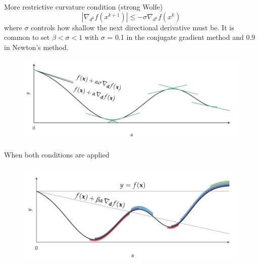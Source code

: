 \documentclass{beamer}
\begin{document}
\begin{frame}{More restrictive curvature condition (strong Wolfe)}
    \begin{equation*}
        |\nabla _{d^k} f(x^{k+1})| \leq -\sigma \nabla _{d^k} f(x^k)
    \end{equation*}
where $\sigma$ controls how shallow the next directional derivative must be.
It is common to set $\beta < \sigma < 1$ with $\sigma$ = 0.1 in the conjugate gradient method and 0.9 in Newton’s method.
\begin{figure}
\centering
\includegraphics[width=120mm]{Figs/curvature2.jpeg}
\end{figure}
\end{frame}

\begin{frame}{When both conditions are applied}
\begin{figure}
\centering
\includegraphics[width=120mm]{Figs/two-conditions.jpeg}
\end{figure}
\end{frame}
\end{document}
